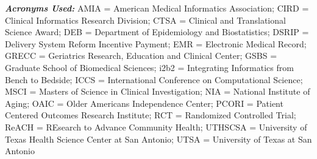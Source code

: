   \emph{\textbf{Acronyms Used:}} AMIA = American Medical Informatics
  Association; CIRD = Clinical Informatics Research Division; CTSA =
  Clinical and Translational Science Award; DEB = Department of
  Epidemiology and Biostatistics; DSRIP = Delivery System Reform
  Incentive Payment; EMR = Electronic Medical Record; GRECC = Geriatrics
  Research, Education and Clinical Center; GSBS = Graduate School of
  Biomedical Sciences; i2b2 = Integrating Informatics from Bench to
  Bedside; ICCS = International Conference on Computational Science;
  MSCI = Masters of Science in Clinical Investigation; NIA = National
  Institute of Aging; OAIC = Older Americans Independence Center; PCORI
  = Patient Centered Outcomes Research Institute; RCT = Randomized
  Controlled Trial; ReACH = REsearch to Advance Community Health;
  UTHSCSA = University of Texas Health Science Center at San Antonio;
  UTSA = University of Texas at San Antonio

